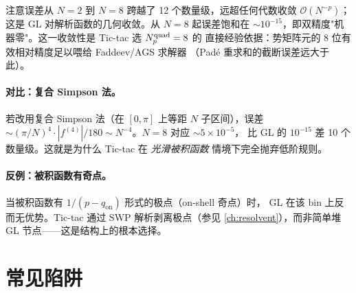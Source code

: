 注意误差从 $N=2$ 到 $N=8$ 跨越了 12 个数量级，远超任何代数收敛
$\mathcal{O}(N^{-p})$；这是 GL 对解析函数的几何收敛。从 $N=8$ 起误差饱和在
$\sim 10^{-15}$，即双精度"机器零"。这一收敛性是 Tic-tac 选 ${N_{p}^{\text{quad}}}=8$ 的
直接经验依据：势矩阵元的 8 位有效相对精度足以喂给 Faddeev/AGS 求解器
（Padé 重求和的截断误差远大于此）。

\paragraph{对比：复合 Simpson 法。}
若改用复合 Simpson 法（在 $[0,\pi]$ 上等距 $N$ 子区间），误差
$\sim (\pi/N)^{4}\cdot|f^{(4)}|/180\sim N^{-4}$。$N=8$ 对应 $\sim 5\times 10^{-5}$，
比 GL 的 $10^{-15}$ 差 10 个数量级。这就是为什么 Tic-tac 在 \emph{光滑被积函数}
情境下完全抛弃低阶规则。

\paragraph{反例：被积函数有奇点。}
当被积函数有 $1/(p-q_{\text{on}})$ 形式的极点（on-shell 奇点）时，
GL 在该 bin 上反而无优势。Tic-tac 通过 SWP 解析剥离极点（参见
\cref{ch:resolvent}），而非简单堆 GL 节点——这是结构上的根本选择。

\section{常见陷阱}

